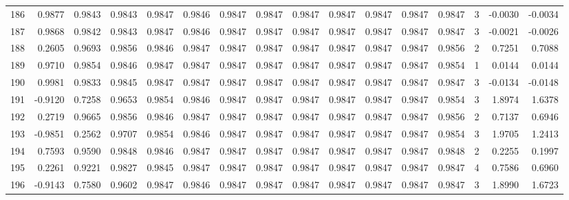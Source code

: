 \begin{tabular}{lrrrrrrrrrrrrrrr}
186 &      0.9877 &  0.9843 &  0.9843 &  0.9847 &  0.9846 &  0.9847 &  0.9847 &  0.9847 &  0.9847 &  0.9847 &   0.9847 &     0.9847 &      3 &                   -0.0030 &                    -0.0034 \\
187 &      0.9868 &  0.9842 &  0.9843 &  0.9847 &  0.9846 &  0.9847 &  0.9847 &  0.9847 &  0.9847 &  0.9847 &   0.9847 &     0.9847 &      3 &                   -0.0021 &                    -0.0026 \\
188 &      0.2605 &  0.9693 &  0.9856 &  0.9846 &  0.9847 &  0.9847 &  0.9847 &  0.9847 &  0.9847 &  0.9847 &   0.9847 &     0.9856 &      2 &                    0.7251 &                     0.7088 \\
189 &      0.9710 &  0.9854 &  0.9846 &  0.9847 &  0.9847 &  0.9847 &  0.9847 &  0.9847 &  0.9847 &  0.9847 &   0.9847 &     0.9854 &      1 &                    0.0144 &                     0.0144 \\
190 &      0.9981 &  0.9833 &  0.9845 &  0.9847 &  0.9847 &  0.9847 &  0.9847 &  0.9847 &  0.9847 &  0.9847 &   0.9847 &     0.9847 &      3 &                   -0.0134 &                    -0.0148 \\
191 &     -0.9120 &  0.7258 &  0.9653 &  0.9854 &  0.9846 &  0.9847 &  0.9847 &  0.9847 &  0.9847 &  0.9847 &   0.9847 &     0.9854 &      3 &                    1.8974 &                     1.6378 \\
192 &      0.2719 &  0.9665 &  0.9856 &  0.9846 &  0.9847 &  0.9847 &  0.9847 &  0.9847 &  0.9847 &  0.9847 &   0.9847 &     0.9856 &      2 &                    0.7137 &                     0.6946 \\
193 &     -0.9851 &  0.2562 &  0.9707 &  0.9854 &  0.9846 &  0.9847 &  0.9847 &  0.9847 &  0.9847 &  0.9847 &   0.9847 &     0.9854 &      3 &                    1.9705 &                     1.2413 \\
194 &      0.7593 &  0.9590 &  0.9848 &  0.9846 &  0.9847 &  0.9847 &  0.9847 &  0.9847 &  0.9847 &  0.9847 &   0.9847 &     0.9848 &      2 &                    0.2255 &                     0.1997 \\
195 &      0.2261 &  0.9221 &  0.9827 &  0.9845 &  0.9847 &  0.9847 &  0.9847 &  0.9847 &  0.9847 &  0.9847 &   0.9847 &     0.9847 &      4 &                    0.7586 &                     0.6960 \\
196 &     -0.9143 &  0.7580 &  0.9602 &  0.9847 &  0.9846 &  0.9847 &  0.9847 &  0.9847 &  0.9847 &  0.9847 &   0.9847 &     0.9847 &      3 &                    1.8990 &                     1.6723 \\

\end{tabular}
